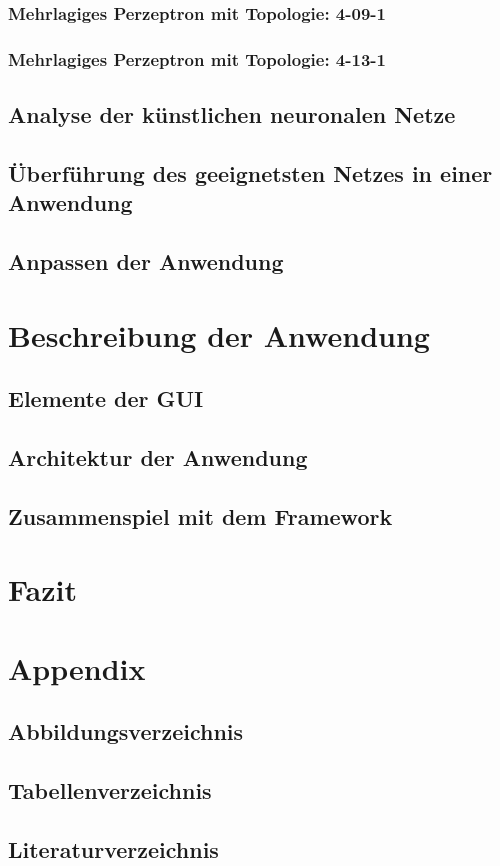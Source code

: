\documentclass[11pt,a4paper]{scrreprt}
\begin{document}
		\subsection{Mehrlagiges Perzeptron mit Topologie: 4-09-1} %
		\subsection{Mehrlagiges Perzeptron mit Topologie: 4-13-1} %
  \section{Analyse der künstlichen neuronalen Netze} %
	\section{Überführung des geeignetsten Netzes in einer Anwendung}
	\section{Anpassen der Anwendung} %

\chapter{Beschreibung der Anwendung} %
	\section{Elemente der GUI} %
	\section{Architektur der Anwendung} %
	\section{Zusammenspiel mit dem Framework} %

\chapter{Fazit} %

\chapter{Appendix}
	\section{Abbildungsverzeichnis}
	\section{Tabellenverzeichnis}
	\section{Literaturverzeichnis}
\end{document}
